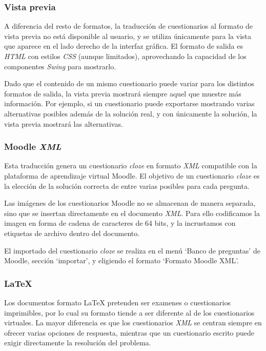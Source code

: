 
\subsubsection{Vista previa}
A diferencia del resto de formatos, la traducción de cuestionarios al formato de vista previa no está disponible al usuario, y se utiliza únicamente para la vista que aparece en el lado derecho de la interfaz gráfica.
El formato de salida es \emph{HTML} con estilos \emph{CSS} (aunque limitados), aprovechando la capacidad de los componentes \emph{Swing} para mostrarlo.

Dado que el contenido de un mismo cuestionario puede variar para los distintos formatos de salida, la vista previa mostrará siempre aquel que muestre más información.
Por ejemplo, si un cuestionario puede exportarse mostrando varias alternativas posibles además de la solución real, y con únicamente la solución, la vista previa mostrará las alternativas.

\subsubsection{Moodle \emph{XML}}
Esta traducción genera un cuestionario \emph{cloze} en formato \emph{XML} compatible con la plataforma de aprendizaje virtual Moodle.
El objetivo de un cuestionario \emph{cloze} es la elección de la solución correcta de entre varias posibles para cada pregunta.

Las imágenes de los cuestionarios Moodle no se almacenan de manera separada, sino que se insertan directamente en el documento \emph{XML}.
Para ello codificamos la imagen en forma de cadena de caracteres de 64 bits, y la incrustamos con etiquetas de archivo dentro del documento.

El importado del cuestionario \emph{cloze} se realiza en el menú `Banco de preguntas' de Moodle, sección `importar', y eligiendo el formato `Formato Moodle XML'.


\subsubsection{\LaTeX{}}
Los documentos formato \LaTeX{} pretenden ser examenes o cuestionarios imprimibles, por lo cual su formato tiende a ser diferente al de los cuestionarios virtuales.
La mayor diferencia es que los cuestionarios \emph{XML} se centran siempre en ofrecer varias opciones de respuesta, mientras que un cuestionario escrito puede exigir directamente la resolución del problema.

